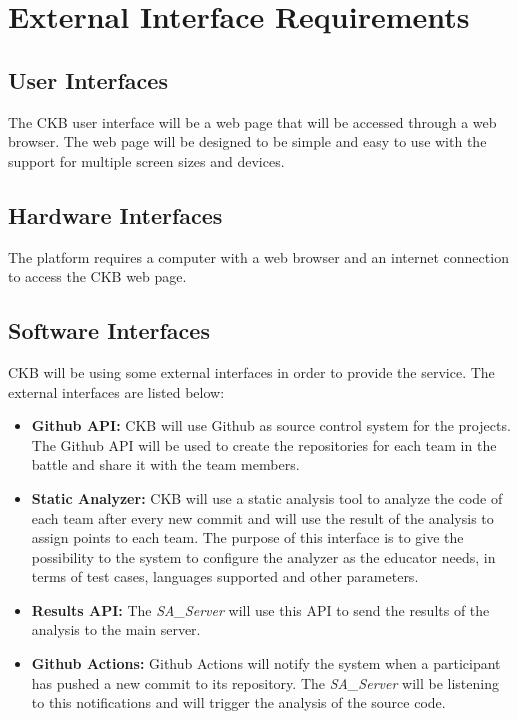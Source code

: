 
\section{External Interface Requirements}
\label{s:External_interface_requirements}%

\subsection{User Interfaces}
\label{ss:User_interfaces}%

The CKB user interface will be a web page that will be accessed through a web browser. The web page will be designed to be simple and easy to use with the support for multiple screen sizes and devices.

\subsection{Hardware Interfaces}
\label{ss:Hardware_interfaces}%

The platform requires a computer with a web browser and an internet connection to access the CKB web page. 

\subsection{Software Interfaces}
\label{ss:Software_interfaces}%

CKB will be using some external interfaces in order to provide the service. The external interfaces are listed below:
\begin{itemize}
  \item \textbf{Github API:} CKB will use Github as source control system for the projects. The Github API will be used to create the repositories for each team in the battle and share it with the team members.
  \item \textbf{Static Analyzer:} CKB will use a static analysis tool to analyze the code of each team after every new commit and will use the result of the analysis to assign points to each team. The purpose of this interface is to give the possibility to the system to configure the analyzer as the educator needs, in terms of test cases, languages supported and other parameters.
  \item \textbf{Results API: } The \textit{SA\_Server} will use this API to send the results of the analysis to the main server.
  \item \textbf{Github Actions: } Github Actions will notify the system when a participant has pushed a new commit to its repository. The \textit{SA\_Server} will be listening to this notifications and will trigger the analysis of the source code.
\end{itemize}

